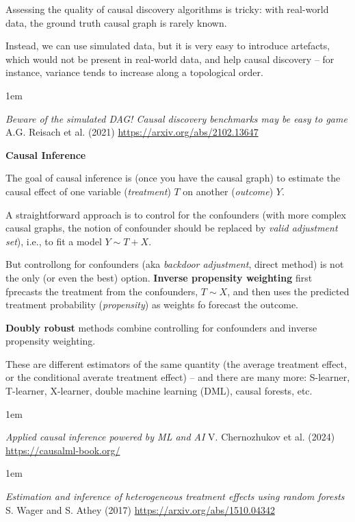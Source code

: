 \documentclass[a5paper]{article}
\let\d\textbf
\newenvironment{reference}{%
  \medskip\goodbreak
  \parskip 0pt
  \raggedright
  \leftskip 1em
  \obeylines
}{\par\medskip\goodbreak}
\def\subsection#1{{\par\bigskip\goodbreak\large\bfseries #1\par}}
\begin{document}
Assessing the quality of causal discovery algorithms is tricky:
with real-world data, the ground truth causal graph is rarely known.

Instead, we can use simulated data, but it is very easy
to introduce artefacts, which would not be present in real-world data,
and help causal discovery --
for instance, variance tends to increase along a topological order.

\begin{reference}
  \emph{Beware of the simulated DAG! Causal discovery benchmarks may be easy to game}
  A.G. Reisach et al. (2021)
  \url{https://arxiv.org/abs/2102.13647}
\end{reference}

\subsection{Causal Inference}

The goal of causal inference is (once you have the causal graph)
to estimate the causal effect of one variable (\emph{treatment}) $T$
on another (\emph{outcome}) $Y$.

A straightforward approach is to control for the confounders
(with more complex causal graphs, the notion of confounder
should be replaced by \emph{valid adjustment set}),
i.e., to fit a model $Y \sim T + X$.

But controllong for confounders (aka \emph{backdoor adjustment}, direct method)
is not the only
(or even the best) option.
\d{Inverse propensity weighting}
first fprecasts the treatment from the confounders,
$T \sim X$,
and then uses the predicted treatment probability (\emph{propensity})
as weights fo forecast the outcome.

\d{Doubly robust} methods combine controlling for confounders
and inverse propensity weighting.

These are different estimators of the same quantity
(the average treatment effect, or the
conditional averate treatment effect) -- and there are many more:
S-learner, T-learner, X-learner, double machine learning (DML),
causal forests, etc.

\begin{reference}
  \emph{Applied causal inference powered by ML and AI}
  V. Chernozhukov et al. (2024)
  \url{https://causalml-book.org/}
\end{reference}

\begin{reference}
  \emph{Estimation and inference of heterogeneous treatment effects using random forests}
  S. Wager and S. Athey (2017)
  \url{https://arxiv.org/abs/1510.04342}
\end{reference}
\end{document}
